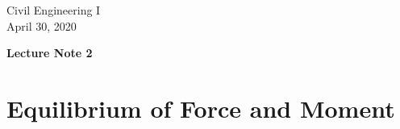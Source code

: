 \documentclass[10pt,a4j]{article}
\newlength{\minitwocolumn}
\begin{document}
\newcommand{\fat}[1]{\mbox{\boldmath $#1$}}
\newcommand{\D}{\partial}
\newcommand{\w}{\omega}
\newcommand{\ga}{\alpha}
\newcommand{\gb}{\beta}
\newcommand{\gx}{\xi}
\newcommand{\gz}{\zeta}
\newcommand{\vhat}[1]{\hat{\fat{#1}}}
\newcommand{\spc}{\vspace{0.7\baselineskip}}
\newcommand{\halfspc}{\vspace{0.3\baselineskip}}

\newcommand{\twofig}[2]
 {
   \begin{figure}
     \begin{minipage}[t]{\minitwocolumn}
         \begin{center}   #1
         \end{center}
     \end{minipage}
         \hspace{\columnsep}
     \begin{minipage}[t]{\minitwocolumn}
         \begin{center} #2
         \end{center}
     \end{minipage}
   \end{figure}
 }
\begin{flushright}
	Civil Engineering I\\
	April 30, 2020
\end{flushright}
\begin{center}
	{\LARGE \bf Lecture Note 2}
\end{center}
\setcounter{section}{1}
\section{Equilibrium of Force and Moment}
\end{document}
